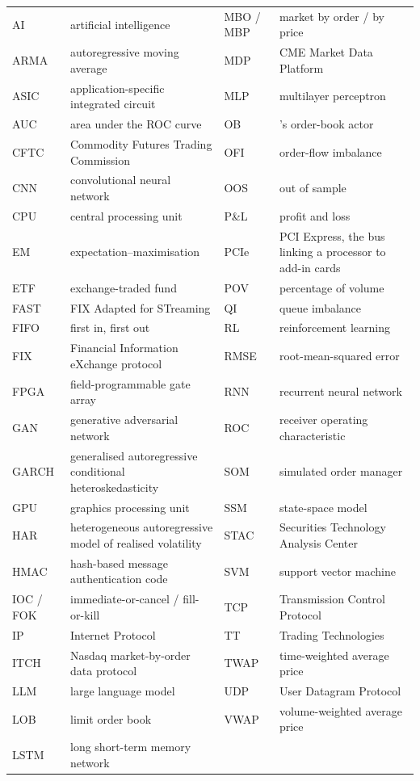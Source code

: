 \begin{center}\footnotesize
\begin{tabularx}{\linewidth}{lX@{\hspace{1em}}lX}
\toprule
AI & artificial intelligence & MBO / MBP & market by order / by price \\
ARMA & autoregressive moving average & MDP & CME Market Data Platform \\
ASIC & application-specific integrated circuit & MLP & multilayer perceptron \\
AUC & area under the ROC curve & OB & \kasparhft{}'s order-book actor \\
CFTC & Commodity Futures Trading Commission & OFI & order-flow imbalance \\
CNN & convolutional neural network & OOS & out of sample \\
CPU & central processing unit & P\&L & profit and loss \\
EM & expectation--maximisation & PCIe & PCI Express, the bus linking a processor to add-in cards \\
ETF & exchange-traded fund & POV & percentage of volume \\
FAST & FIX Adapted for STreaming & QI & queue imbalance \\
FIFO & first in, first out & RL & reinforcement learning \\
FIX & Financial Information eXchange protocol & RMSE & root-mean-squared error \\
FPGA & field-programmable gate array & RNN & recurrent neural network \\
GAN & generative adversarial network & ROC & receiver operating characteristic \\
GARCH & generalised autoregressive conditional heteroskedasticity & SOM & simulated order manager \\
GPU & graphics processing unit & SSM & state-space model \\
HAR & heterogeneous autoregressive model of realised volatility & STAC & Securities Technology Analysis Center \\
HMAC & hash-based message authentication code & SVM & support vector machine \\
IOC / FOK & immediate-or-cancel / fill-or-kill & TCP & Transmission Control Protocol \\
IP & Internet Protocol & TT & Trading Technologies \\
ITCH & Nasdaq market-by-order data protocol & TWAP & time-weighted average price \\
LLM & large language model & UDP & User Datagram Protocol \\
LOB & limit order book & VWAP & volume-weighted average price \\
LSTM & long short-term memory network &  &  \\
\bottomrule
\end{tabularx}
\end{center}
